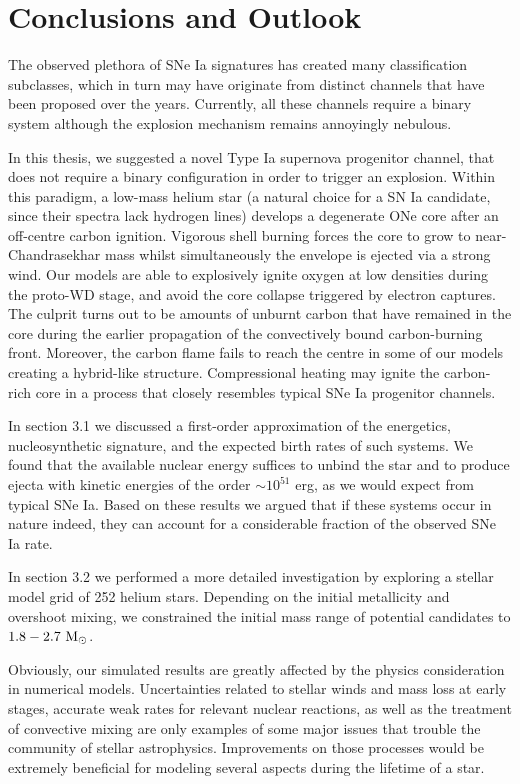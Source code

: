 \documentclass[../../main/thesis_msc.tex]{subfiles}
\begin{document}
\chapter{Conclusions and Outlook}
	
		The observed plethora of SNe Ia signatures has created many classification subclasses, which in turn may have originate from distinct channels that have been proposed over the years. Currently, all these channels require a binary system although the explosion mechanism remains annoyingly nebulous. 


		In this thesis, we suggested a novel Type Ia supernova progenitor channel, that does not require a binary configuration in order to trigger an explosion. Within this paradigm, a low-mass helium star (a natural choice for a SN Ia candidate, since their spectra lack hydrogen lines) develops a degenerate ONe core after an off-centre carbon ignition. Vigorous shell burning forces the core to grow to near-Chandrasekhar mass whilst simultaneously the envelope is ejected via a strong wind. Our models are able to explosively ignite oxygen at low densities during the proto-WD stage, and avoid the core collapse triggered by electron captures. The culprit turns out to be amounts of unburnt carbon that have remained in the core during the earlier propagation of the convectively bound carbon-burning front.
		Moreover, the carbon flame fails to reach the centre in some of our models creating a hybrid-like structure. Compressional heating may ignite the carbon-rich core in a process that closely resembles typical SNe Ia progenitor channels.
		
		
		In section 3.1 we discussed a first-order approximation of the energetics, nucleosynthetic signature, and the expected birth rates of such systems. We found that the available nuclear energy suffices to unbind the star and to produce ejecta with kinetic energies of the order $\sim 10^{51}$ erg, as we would expect from typical SNe Ia. Based on these results we argued that if these systems occur in nature indeed, they can account for a considerable fraction of the observed SNe Ia rate.
		
		In section 3.2 we performed a more detailed investigation by exploring a stellar model grid of 252 helium stars. Depending on the initial metallicity and overshoot mixing, we constrained the initial mass range of potential candidates to $\rm 1.8 - 2.7 \ M_{\odot}$.
		
		
		Obviously, our simulated results are greatly affected by the physics consideration in numerical models. Uncertainties related to stellar winds and mass loss at early stages, accurate weak rates for relevant nuclear reactions, as well as the treatment of convective mixing are only examples of some major issues that trouble the community of stellar astrophysics. Improvements on those processes would be extremely beneficial for modeling several aspects during the lifetime of a star.
		
\end{document}
